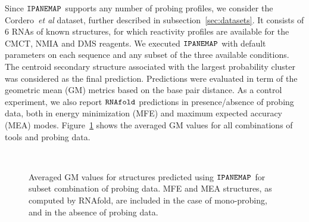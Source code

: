 \documentclass[a4,center,fleqn]{NAR}
\newcommand{\Software}[1]{$\text{\ttfamily #1}$}
\newcommand{\OurTool}{\Software{IPANEMAP}\xspace}
\begin{document}
Since \OurTool{} supports any number of probing profiles, we consider the Cordero~\emph{et al} dataset, further described in subsection~\ref{sec:datasets}. It consists of 6 RNAs of known structures, for which reactivity profiles are available for the CMCT, NMIA and DMS reagents. We executed \OurTool{} with default parameters on each sequence and any subset of the three available conditions. The centroid secondary structure  associated with the largest probability cluster was considered as the final prediction. Predictions were evaluated in term of the geometric mean (GM) metrics based on the base pair distance. As a control experiment, we also report ${\tt RNAfold}$ predictions in presence/absence of probing data, both in energy minimization (MFE) and maximum expected accuracy (MEA) modes. Figure~\ref{cordero1} shows the averaged GM values for all combinations of tools and probing data.



\begin{figure}
	{\\}
	
	\caption{Averaged GM values for structures  predicted using \OurTool{} for subset combination of probing data. MFE and MEA structures, as computed by RNAfold, are included in the case of mono-probing, and in the absence of probing data.}
	\label{cordero1}
\end{figure}
\end{document}
